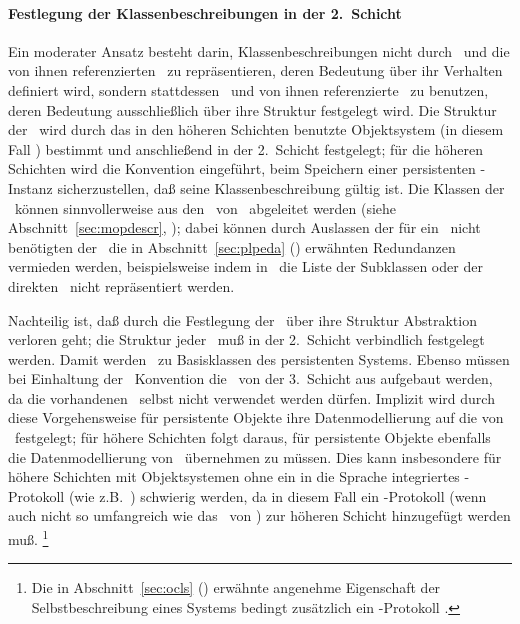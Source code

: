 \paragraph{Festlegung der Klassenbeschreibungen in der 2.\ Schicht}%
%
Ein moderater Ansatz besteht darin, Klassenbeschreibungen
nicht durch \clsmo[e]\ und die von ihnen referenzierten \mo[e]\ zu
repr\"{a}sentieren, deren Bedeutung \"{u}ber ihr Verhalten definiert
wird, sondern stattdessen \clsdo[e]\ und von ihnen referenzierte
\deo[e]\ zu benutzen, deren Bedeutung ausschlie\ss{}lich \"{u}ber ihre
Struktur festgelegt wird. Die Struktur der \deo[e]\ wird durch das in
den h\"{o}heren Schichten 
benutzte Objektsystem (in diesem Fall \clos) bestimmt und 
anschlie\ss{}end in der 2.~Schicht festgelegt; f\"{u}r die
h\"{o}heren Schichten wird die Konvention eingef\"{u}hrt, beim Speichern einer
persistenten \clos-Instanz sicherzustellen, da\ss{} seine
Klassenbeschreibung g\"{u}ltig ist.
Die Klassen der \deo[e]\ k\"{o}n\-nen sinnvollerweise aus den \mc[n]\ von
\clos\ abgeleitet werden (siehe Abschnitt~\ref{sec:mopdescr},
\citepage{\pageref{sec:mopdescr}}); dabei k\"{o}n\-nen durch Auslassen der
f\"{u}r ein \deo\ nicht ben\"{o}tigten \Slt[s]\/ der \mo[e]\ die in
Abschnitt~\ref{sec:plpeda} (\citepage{\pageref{sec:plpeda}})
erw\"{a}hnten Redundanzen vermieden werden, beispielsweise indem in
\clsdo[en]\ die Liste der Subklassen oder der direkten \mtd[n]\ nicht
repr\"{a}sentiert werden.
%
\par{}Nachteilig ist, da\ss{} durch die Festlegung der \dec[n]\ \"{u}ber
ihre Struktur Abstraktion verloren geht; die Struktur jeder \dec\ mu\ss{}
in der 2.~Schicht verbindlich festgelegt werden. Damit werden
\dec[n]\ zu Basisklassen des persistenten Systems. Ebenso m\"{u}ssen bei
Einhaltung der \og[en]\ Konvention die \deo[e]\ von der 3.~Schicht aus
aufgebaut werden, da die vorhandenen \mo[e]\ selbst nicht verwendet
werden d\"{u}rfen. Implizit wird durch diese Vorgehensweise f\"{u}r
persistente Objekte ihre Datenmodellierung auf die von
\clos\ festgelegt; f\"{u}r h\"{o}here Schichten folgt daraus, f\"{u}r
persistente Objekte ebenfalls die Datenmodellierung von
\clos\ \"{u}bernehmen zu  m\"{u}ssen.  Dies kann insbesondere f\"{u}r h\"{o}here
Schichten mit Objektsystemen ohne ein in die Sprache integriertes
\mo-Protokoll (wie z.B.\ \cpp) schwierig werden, da in diesem Fall ein
\mo-Protokoll (wenn auch nicht so umfangreich wie das \mop\ von \clos)
zur h\"{o}heren Schicht hinzugef\"{u}gt werden mu\ss{}.%
\footnote{Die in Abschnitt~\ref{sec:ocls}
(\citepage{\pageref{sec:ocls}}) erw\"{a}hnte angenehme Eigenschaft der
Selbstbeschreibung eines Systems bedingt zu\-s\"{a}tz\-lich ein
\mo-Protokoll \cite[]{bib:we90}.}
%
